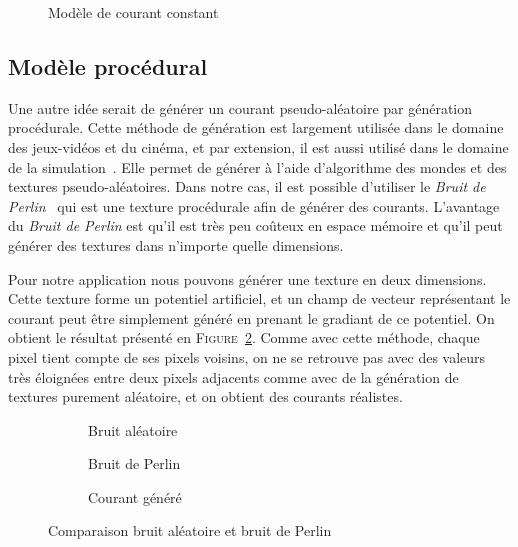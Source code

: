 			\begin{figure}[!htb]
				\centering
				\caption{Modèle de courant constant}
				\label{fig:constant}
			\end{figure}

		\subsection{Modèle procédural}

			Une autre idée serait de générer un courant pseudo-aléatoire par génération procédurale. Cette méthode de génération est largement utilisée dans le domaine des jeux-vidéos et du cinéma, et par extension, il est aussi utilisé dans le domaine de la simulation~\cite{generation_procedurale_monde, volumetric_terrain_generation}. Elle permet de générer à l'aide d'algorithme des mondes et des textures pseudo-aléatoires. Dans notre cas, il est possible d'utiliser le \textit{Bruit de Perlin}~\cite{PerlinNoise} qui est une texture procédurale afin de générer des courants. L'avantage du \textit{Bruit de Perlin} est qu'il est très peu coûteux en espace mémoire et qu'il peut générer des textures dans n'importe quelle dimensions. 
			
			Pour notre application nous pouvons générer une texture en deux dimensions. Cette texture forme un potentiel artificiel, et un champ de vecteur représentant le courant peut être simplement généré en prenant le gradiant de ce potentiel. On obtient le résultat présenté en \textsc{Figure}~\ref{fig:perlin_noise}. Comme avec cette méthode, chaque pixel tient compte de ses pixels voisins, on ne se retrouve pas avec des valeurs très éloignées entre deux pixels adjacents comme avec de la génération de textures purement aléatoire, et on obtient des courants réalistes.

			\begin{figure}[!htb]
				\centering
				\begin{subfigure}[b]{0.32\textwidth}
					\centering
					\caption{Bruit aléatoire}
				\end{subfigure}
				\hfill
				\begin{subfigure}[b]{0.32\textwidth}
					\centering
					\caption{Bruit de Perlin}
				\end{subfigure}
				\hfill
				\begin{subfigure}[b]{0.32\textwidth}
					\centering
					\caption{Courant généré}
				\end{subfigure}
				\caption{Comparaison bruit aléatoire et bruit de Perlin}
				\label{fig:perlin_noise}
			\end{figure}


